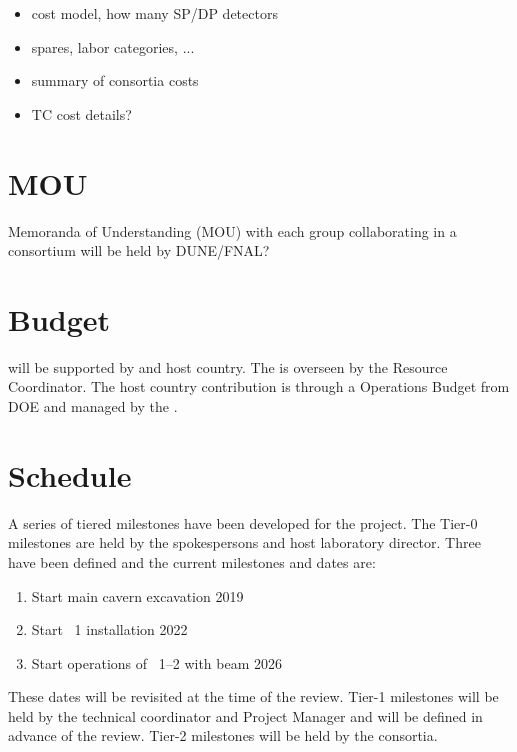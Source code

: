 \begin{itemize}
 \item cost model, how many SP/DP detectors
 \item spares, labor categories, ...
 \item summary of consortia costs
 \item TC cost details?
\end{itemize}

\section{MOU}
\label{sec:fdsp-coord-mou}

Memoranda of Understanding (MOU) with each group collaborating in a
consortium will be held by DUNE/FNAL?

\section{Budget}
\label{sec:fdsp-coord-budget}

  will be supported by  and host
country. The  is overseen by the Resource Coordinator. The
host country contribution is through a 
Operations Budget from DOE and managed by the .

\section{Schedule}
\label{sec:fdsp-coord-controls}

A series of tiered milestones have been developed for the 
project. The Tier-0 milestones are held by the spokespersons and host
laboratory director. Three have been defined and the current milestones and
dates are:
\begin{enumerate}
\item Start main cavern excavation \hspace{2.58in} 2019
\item Start ~1 installation \hspace{2.1in} 2022
\item Start operations of ~1--2 with beam \hspace{1in} 2026
\end{enumerate}
These dates will be revisited at the time of the  review.  Tier-1
milestones will be held by the technical coordinator and  Project
Manager and will be defined in advance of the  review. Tier-2
milestones will be held by the consortia.

